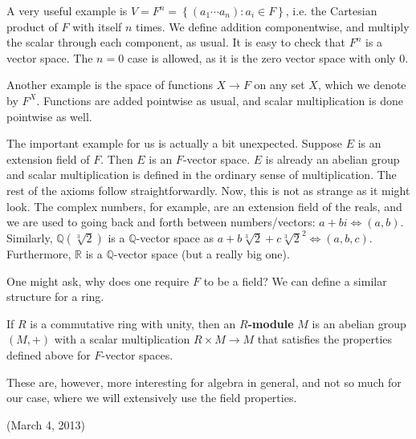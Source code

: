 \documentclass{../mathnotes}
\begin{document}
A very useful example is $V=F^n=\left\{ (a_1\cdots a_n): a_i\in F \right\}$, i.e. the Cartesian product of $F$ with itself $n$ times.
We define addition componentwise, and multiply the scalar through each component, as usual. It is easy to check that $F^n$ is a vector space.
The $n=0$ case is allowed, as it is the zero vector space with only 0.

Another example is the space of functions $X\to F$ on any set $X$, which we denote by $F^X$. Functions are added pointwise as usual,
and scalar multiplication is done pointwise as well.

The important example for us is actually a bit unexpected. Suppose $E$ is an extension field of $F$. Then $E$ is an $F$-vector space.
$E$ is already an abelian group and scalar multiplication is defined in the ordinary sense of multiplication. The rest of the axioms
follow straightforwardly. Now, this is not as strange as it might look. The complex numbers, for example, are an extension field of the reals,
and we are used to going back and forth between numbers/vectors: $a+bi\iff (a,b)$. Similarly, $\mathbb{Q}(\sqrt[3]{2})$ is a $\mathbb{Q}$-vector
space as $a+b\sqrt[3]{2}+c\sqrt[3]{2}^2\iff (a,b,c)$. Furthermore, $\mathbb{R}$ is a $\mathbb{Q}$-vector space (but a really big one).

One might ask, why does one require $F$ to be a field? We can define a similar structure for a ring.
\begin{defn}
    If $R$ is a commutative ring with unity, then an \textbf{$R$-module} $M$ is an abelian group $(M,+)$ with a scalar multiplication
    $R\times M\to M$ that satisfies the properties defined above for $F$-vector spaces.
\end{defn}
These are, however, more interesting for algebra in general, and not so much for our case, where we will extensively use the field properties.


(March 4, 2013)

\end{document}
